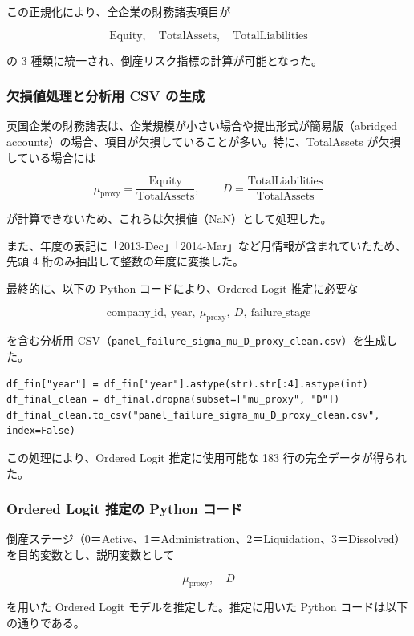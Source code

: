 この正規化により、全企業の財務諸表項目が


\[
\text{Equity},\quad \text{TotalAssets},\quad \text{TotalLiabilities}
\]


の 3 種類に統一され、倒産リスク指標の計算が可能となった。

\subsubsection*{欠損値処理と分析用 CSV の生成}
英国企業の財務諸表は、企業規模が小さい場合や提出形式が簡易版（abridged accounts）の場合、項目が欠損していることが多い。特に、TotalAssets が欠損している場合には


\[
\mu_{\text{proxy}} = \frac{\text{Equity}}{\text{TotalAssets}},\qquad
D = \frac{\text{TotalLiabilities}}{\text{TotalAssets}}
\]


が計算できないため、これらは欠損値（NaN）として処理した。

また、年度の表記に「2013-Dec」「2014-Mar」など月情報が含まれていたため、先頭 4 桁のみ抽出して整数の年度に変換した。

最終的に、以下の Python コードにより、Ordered Logit 推定に必要な


\[
\text{company\_id},\ \text{year},\ \mu_{\text{proxy}},\ D,\ \text{failure\_stage}
\]


を含む分析用 CSV（\texttt{panel\_failure\_sigma\_mu\_D\_proxy\_clean.csv}）を生成した。

\begin{verbatim}
df_fin["year"] = df_fin["year"].astype(str).str[:4].astype(int)
df_final_clean = df_final.dropna(subset=["mu_proxy", "D"])
df_final_clean.to_csv("panel_failure_sigma_mu_D_proxy_clean.csv", index=False)
\end{verbatim}

この処理により、Ordered Logit 推定に使用可能な 183 行の完全データが得られた。

\subsubsection*{Ordered Logit 推定の Python コード}
倒産ステージ（0＝Active、1＝Administration、2＝Liquidation、3＝Dissolved）を目的変数とし、説明変数として


\[
\mu_{\text{proxy}},\quad D
\]


を用いた Ordered Logit モデルを推定した。推定に用いた Python コードは以下の通りである。

